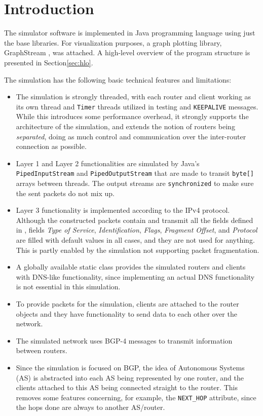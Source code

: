 \documentclass[11pt,a4paper,titlepage]{report}
\begin{document}
\section{Introduction}\label{sec:intro}
The simulator software is implemented in Java programming language using just the base libraries. For visualization purposes, a graph plotting library, GraphStream \cite{graphstreamteam2017}, was attached. A high-level overview of the program structure is presented in Section\ref{sec:hlo}.

The simulation has the following basic technical features and limitations:
\begin{itemize}
\item The simulation is strongly threaded, with each router and client working as its own thread and \texttt{Timer} threads utilized in testing and \texttt{KEEPALIVE} messages. While this introduces some performance overhead, it strongly supports the architecture of the simulation, and extends the notion of routers being \emph{separated}, doing as much control and communication over the inter-router connection as possible.
\item Layer 1 and Layer 2 functionalities are simulated by Java's \texttt{PipedInputStream} and \texttt{PipedOutputStream} that are made to transit \texttt{byte[]} arrays between threads. The output streams are \texttt{synchronized} to make sure the sent packets do not mix up.
\item Layer 3 functionality is implemented according to the IPv4 protocol. Although the constructed packets contain and transmit all the fields defined in \cite{RFC0791}, fields \emph{Type of Service}, \emph{Identification}, \emph{Flags}, \emph{Fragment Offset}, and \emph{Protocol} are filled with default values in all cases, and they are not used for anything. This is partly enabled by the simulation not supporting packet fragmentation.
\item A globally available static class provides the simulated routers and clients with DNS-like functionality, since implementing an actual DNS functionality is not essential in this simulation.
\item To provide packets for the simulation, clients are attached to the router objects and they have functionality to send data to each other over the network.
\item The simulated network uses BGP-4 messages to transmit information between routers.
\item Since the simulation is focused on BGP, the idea of Autonomous Systems (AS) is abstracted into each AS being represented by one router, and the clients attached to this AS being connected straight to the router. This removes some features concerning, for example, the \texttt{NEXT\_HOP} attribute, since the hops done are always to another AS/router.

\end{itemize}
\end{document}

